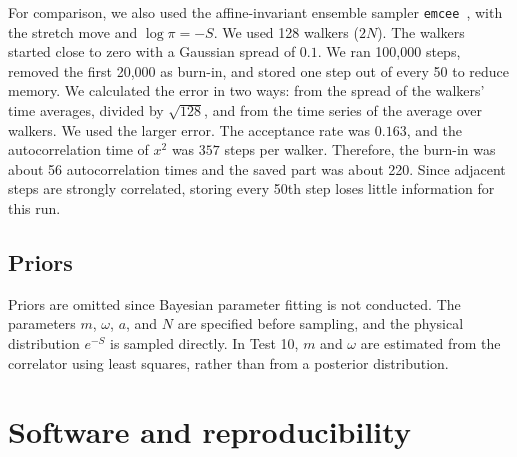 \documentclass[11pt]{article}
\begin{document}
For comparison, we also used the affine-invariant ensemble sampler
\texttt{emcee}~\cite{emcee, goodman}, with the stretch move and
$\log\pi = -S$. We used 128 walkers ($2N$). The walkers started close to zero
with a Gaussian spread of $0.1$. We ran 100{,}000 steps, removed the first
20{,}000 as burn-in, and stored one step out of every 50 to reduce memory. We
calculated the error in two ways: from the spread of the walkers' time
averages, divided by $\sqrt{128}$, and from the time series of the average over
walkers. We used the larger error. The acceptance rate was $0.163$, and the
autocorrelation time of $x^2$ was $357$ steps per walker. Therefore, the
burn-in was about 56 autocorrelation times and the saved part was about 220.
Since adjacent steps are strongly correlated, storing every 50th step loses
little information for this run.

\subsection{Priors}

Priors are omitted since Bayesian parameter fitting is not conducted. The
parameters $m$, $\omega$, $a$, and $N$ are specified before sampling, and the
physical distribution $e^{-S}$ is sampled directly. In Test 10, $m$ and
$\omega$ are estimated from the correlator using least squares, rather than
from a posterior distribution.


\section{Software and reproducibility}\label{sec:software}
\end{document}
